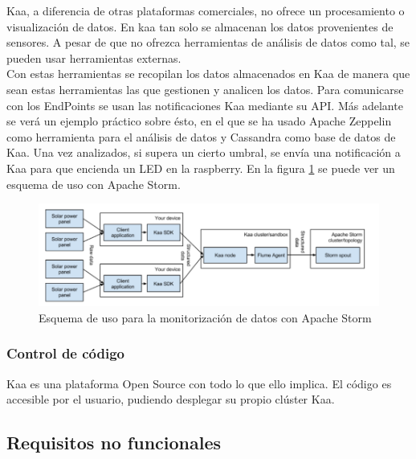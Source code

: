 \documentclass[12pt, twoside]{book}
\begin{document}
Kaa, a diferencia de otras plataformas comerciales, no ofrece un procesamiento o visualización de datos. En kaa tan solo se almacenan los datos provenientes de sensores. A pesar de que no ofrezca herramientas de análisis de datos como tal, se pueden usar herramientas externas. \\
Con estas herramientas se recopilan los datos almacenados en Kaa de manera que sean estas herramientas las que gestionen y analicen los datos. Para comunicarse con los EndPoints se usan las notificaciones Kaa mediante su API.
Más adelante se verá un ejemplo práctico sobre ésto, en el que se ha usado Apache Zeppelin como herramienta para el análisis de datos y Cassandra como base de datos de Kaa. Una vez analizados, si supera un cierto umbral, se envía una notificación a Kaa para que encienda un LED en la raspberry.
En la figura \ref{L507} se puede ver un esquema de uso con Apache Storm.
\begin{figure}[H]
\centering
\includegraphics[scale=0.6]{images/esquema_apache}
\caption{Esquema de uso para la monitorización de datos con Apache Storm}\label{L507}
\end{figure} 
\subsubsection*{Control de código}
Kaa es una plataforma Open Source con todo lo que ello implica. El código es accesible por el usuario,  pudiendo desplegar su propio clúster Kaa.
\subsection{Requisitos no funcionales}
\end{document}
